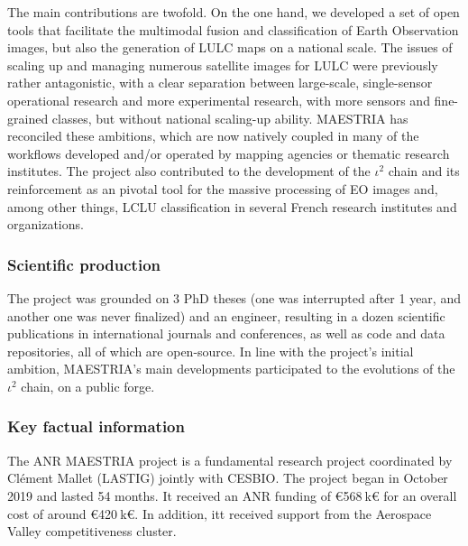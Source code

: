 The main contributions are twofold. On the one hand, we developed a set of open tools that facilitate the multimodal fusion and classification of Earth Observation images, but also the generation of LULC maps on a national scale. The issues of scaling up and managing numerous satellite images for LULC were previously rather antagonistic, with a clear separation between large-scale, single-sensor operational research and more experimental research, with more sensors and fine-grained classes, but without national scaling-up ability. MAESTRIA has reconciled these ambitions, which are now natively coupled in many of the workflows developed and/or operated by mapping agencies or thematic research institutes.
The project also contributed to the development of the $\iota^2$ chain and its reinforcement as an pivotal tool for the massive processing of EO images and, among other things, LCLU classification in several French research institutes and organizations.


\subsubsection*{Scientific production}
The project was grounded on 3 PhD theses (one was interrupted after 1 year, and another one was never finalized) and an engineer, resulting in a dozen scientific publications in international journals and conferences, as well as code and data repositories, all of which are open-source. In line with the project's initial ambition, MAESTRIA's main developments participated to the  evolutions of the \href{https://framagit.org/iota2-project/iota2}{$\iota^2$} chain, on a public forge.

\subsubsection*{Key factual information}
The ANR MAESTRIA project is a fundamental research project coordinated by Clément Mallet (LASTIG) jointly with CESBIO. The project began in October 2019 and lasted 54 months. It received an ANR funding of €568$\:$k€ for an overall cost of around €420$\:$k€. In addition, itt received support from the Aerospace Valley competitiveness cluster.